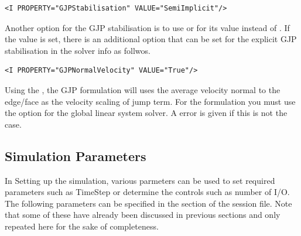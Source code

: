 \begin{lstlisting}[style=XMLStyle]
<I PROPERTY="GJPStabilisation" VALUE="SemiImplicit"/>
\end{lstlisting}

Another option for the GJP stabilisation is to use  or
 for its value instead of . If the
 value is set, there is an additional option that can
be set for the explicit GJP stabilisation in the solver info as
follwos.

\begin{lstlisting}[style=XMLStyle]
<I PROPERTY="GJPNormalVelocity" VALUE="True"/>
\end{lstlisting}
Using the , the GJP formulation will uses the
average velocity normal to the edge/face as the velocity scaling of
jump term. For the  formulation you must use the
 option for the global linear system solver. A
error is given if this is not the case.

\subsection{Simulation Parameters}
In Setting up the simulation, various parmeters can be used to set required 
parameters such as TimeStep or determine the controls such as number of I/O.
The following parameters can be specified in the  section of
the session file. Note that some of these have already been discussed in previous
sections and only repeated here for the sake of completeness.

